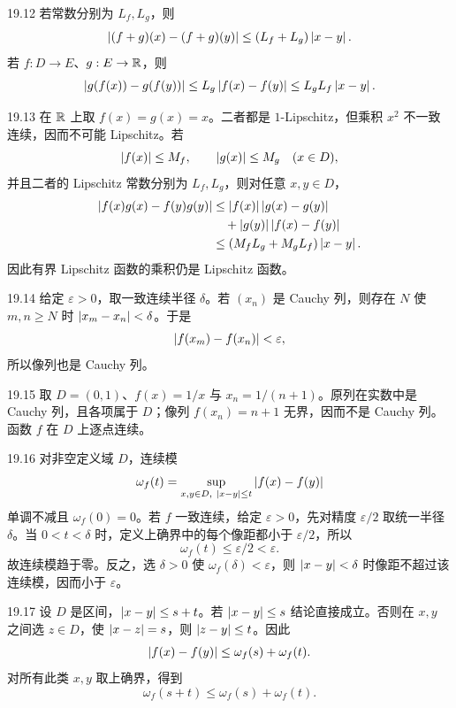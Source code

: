 \begin{solution}{19.12}
若常数分别为 \(L_f,L_g\)，则
\[
 \left|(f+g)(x)-(f+g)(y)\right|
 \le(L_f+L_g)\left|x-y\right|.
\]
若 \(f:D\to E\)、\(g:E\to\mathbb{R}\)，则
\[
 \left|g(f(x))-g(f(y))\right|
 \le L_g\left|f(x)-f(y)\right|
 \le L_gL_f\left|x-y\right|.
\]
\end{solution}

\begin{solution}{19.13}
在 \(\mathbb{R}\) 上取 \(f(x)=g(x)=x\)。二者都是 \(1\)-Lipschitz，但乘积 \(x^2\) 不一致连续，因而不可能 Lipschitz。若
\[
 \left|f(x)\right|\le M_f,\qquad \left|g(x)\right|\le M_g
 \quad(x\in D),
\]
并且二者的 Lipschitz 常数分别为 \(L_f,L_g\)，则对任意 \(x,y\in D\)，
\begin{align*}
 \left|f(x)g(x)-f(y)g(y)\right|
 &\le \left|f(x)\right|\left|g(x)-g(y)\right| \\
 &\quad+\left|g(y)\right|\left|f(x)-f(y)\right| \\
 &\le(M_fL_g+M_gL_f)\left|x-y\right|.
\end{align*}
因此有界 Lipschitz 函数的乘积仍是 Lipschitz 函数。
\end{solution}

\begin{solution}{19.14}
给定 \(\varepsilon>0\)，取一致连续半径 \(\delta\)。若 \((x_n)\) 是 Cauchy 列，则存在 \(N\) 使 \(m,n\ge N\) 时 \(\left|x_m-x_n\right|<\delta\)。于是
\[
 \left|f(x_m)-f(x_n)\right|<\varepsilon,
\]
所以像列也是 Cauchy 列。
\end{solution}

\begin{solution}{19.15}
取 \(D=(0,1)\)、\(f(x)=1/x\) 与 \(x_n=1/(n+1)\)。原列在实数中是 Cauchy 列，且各项属于 \(D\)；像列 \(f(x_n)=n+1\) 无界，因而不是 Cauchy 列。函数 \(f\) 在 \(D\) 上逐点连续。
\end{solution}

\begin{solution}{19.16}
对非空定义域 \(D\)，连续模
\[
 \omega_f(t)=\sup_{x,y\in D,\ \left|x-y\right|\le t}\left|f(x)-f(y)\right|
\]
单调不减且 \(\omega_f(0)=0\)。若 \(f\) 一致连续，给定 \(\varepsilon>0\)，先对精度 \(\varepsilon/2\) 取统一半径 \(\delta\)。当 \(0<t<\delta\) 时，定义上确界中的每个像距都小于 \(\varepsilon/2\)，所以
\[
 \omega_f(t)\le\varepsilon/2<\varepsilon.
\]
故连续模趋于零。反之，选 \(\delta>0\) 使 \(\omega_f(\delta)<\varepsilon\)，则 \(\left|x-y\right|<\delta\) 时像距不超过该连续模，因而小于 \(\varepsilon\)。
\end{solution}

\begin{solution}{19.17}
设 \(D\) 是区间，\(\left|x-y\right|\le s+t\)。若 \(\left|x-y\right|\le s\) 结论直接成立。否则在 \(x,y\) 之间选 \(z\in D\)，使 \(\left|x-z\right|=s\)，则 \(\left|z-y\right|\le t\)。因此
\[
 \left|f(x)-f(y)\right|
 \le\omega_f(s)+\omega_f(t).
\]
对所有此类 \(x,y\) 取上确界，得到
\[
 \omega_f(s+t)\le\omega_f(s)+\omega_f(t).
\]
\end{solution}

